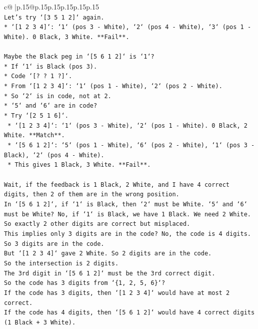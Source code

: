\documentclass{article}
\begin{document}
{\begin{supertabular}{c@{$\;$}|p{.15\linewidth}@{}p{.15\linewidth}p{.15\linewidth}p{.15\linewidth}p{.15\linewidth}p{.15\linewidth}}
{{{\\ 
\texttt{Let's try `{[}3 5 1 2{]}` again.} \\
\texttt{*   `{[}1 2 3 4{]}`: `1` (pos 3 {-} White), `2` (pos 4 {-} White), `3` (pos 1 {-} White). 0 Black, 3 White. **Fail**.} \\
\\ 
\texttt{Maybe the Black peg in `{[}5 6 1 2{]}` is `1`?} \\
\texttt{*   If `1` is Black (pos 3).} \\
\texttt{*   Code `{[}? ? 1 ?{]}`.} \\
\texttt{*   From `{[}1 2 3 4{]}`: `1` (pos 1 {-} White), `2` (pos 2 {-} White).} \\
\texttt{*   So `2` is in code, not at 2.} \\
\texttt{*   `5` and `6` are in code?} \\
\texttt{*   Try `{[}2 5 1 6{]}`.} \\
\texttt{    *   `{[}1 2 3 4{]}`: `1` (pos 3 {-} White), `2` (pos 1 {-} White). 0 Black, 2 White. **Match**.} \\
\texttt{    *   `{[}5 6 1 2{]}`: `5` (pos 1 {-} White), `6` (pos 2 {-} White), `1` (pos 3 {-} Black), `2` (pos 4 {-} White).} \\
\texttt{    *   This gives 1 Black, 3 White. **Fail**.} \\
\\ 
\texttt{Wait, if the feedback is 1 Black, 2 White, and I have 4 correct digits, then 2 of them are in the wrong position.} \\
\texttt{In `{[}5 6 1 2{]}`, if `1` is Black, then `2` must be White. `5` and `6` must be White? No, if `1` is Black, we have 1 Black. We need 2 White. So exactly 2 other digits are correct but misplaced.} \\
\texttt{This implies only 3 digits are in the code? No, the code is 4 digits.} \\
\texttt{So 3 digits are in the code.} \\
\texttt{But `{[}1 2 3 4{]}` gave 2 White. So 2 digits are in the code.} \\
\texttt{So the intersection is 2 digits.} \\
\texttt{The 3rd digit in `{[}5 6 1 2{]}` must be the 3rd correct digit.} \\
\texttt{So the code has 3 digits from `\{1, 2, 5, 6\}`?} \\
\texttt{If the code has 3 digits, then `{[}1 2 3 4{]}` would have at most 2 correct.} \\
\texttt{If the code has 4 digits, then `{[}5 6 1 2{]}` would have 4 correct digits (1 Black + 3 White).} \\
}}}
\end{supertabular}}
\end{document}
